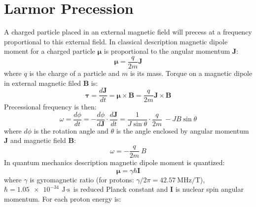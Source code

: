 \section{Larmor Precession}
A charged particle placed in an external magnetic field will precess at a frequency proportional to this external field. 
In classical description magnetic dipole moment for a charged particle $\boldsymbol\mu$ is proportional to the angular momentum $\mathbf{J}$:
\begin{equation}\label{eq: Classical magnetic moment}
	\boldsymbol{\mu}=\frac{q}{2m}\mathbf{J}
\end{equation}
where $q$ is the charge of a particle and $m$ is its mass. 
Torque on a magnetic dipole in external magnetic filed $\mathbf{B}$ is:
\begin{equation}\label{eq: Torque}
	\boldsymbol{\tau}=\frac{d\mathbf{J}}{dt}=\boldsymbol{\mu}\times\mathbf{B}=\frac{q}{2m}\mathbf{J}\times\mathbf{B}
\end{equation}
Precessional frequency is then:
\begin{equation}\label{eq: Classic Larmor frequency}
	\omega=\frac{d\phi}{dt}=-\frac{d\phi}{d\mathbf{J}}\cdot \frac{d\mathbf{J}}{dt}=\frac{1}{J\sin{\theta}}\cdot \frac{q}{2m}\ - J B \sin{\theta}
\end{equation}
where $d\phi$ is the rotation angle and $\theta$ is the angle enclosed by angular momentum $\mathbf{J}$ and magnetic field $\mathbf{B}$:
\begin{equation}\label{eq: Classic Larmor frequency 2}
	\omega=-\frac{q}{2m}\ B
\end{equation}
In quantum mechanics description magnetic dipole moment is quantized:
\begin{equation}\label{eq: Quantum magnetic moment}
	\boldsymbol{\mu}=\gamma\hbar \mathbf{I}
\end{equation}
where  $\gamma$ is gyromagnetic ratio (for protons: $\gamma/2\pi = \SI{42.57}{\mega\hertz /\tesla}$), $\hbar = \SI{1.05e-34}{\joule \cdot \second}$ is reduced Planck constant and $\mathbf{I}$ is nuclear spin angular momentum. For each proton energy is:
